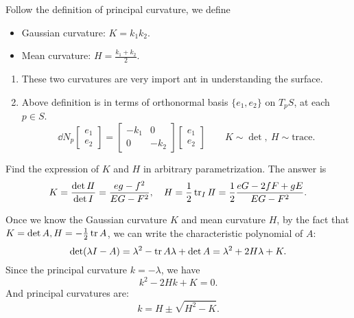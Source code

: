 \begin{definition}
    Follow the definition of principal curvature, we define
    \begin{itemize}
        \item Gaussian curvature: \(K=k_1k_2\).
        \item Mean curvature: \(H=\frac{k_1+k_2}{2}\).
    \end{itemize}
\end{definition}

\begin{remark}
\begin{enumerate}[(1)]
    \item These two curvatures are very import ant in understanding the surface.
    \item Above definition is in terms of orthonormal basis \(\{e_1,e_2\}\) on
        \(T_p S\), at each \(p\in S\). \[
            \dd{N}_p \begin{bmatrix}
                e_1 \\ e_2
            \end{bmatrix}=\begin{bmatrix}
                -k_1 & 0 \\
                0 & -k_2
            \end{bmatrix}\begin{bmatrix}
                e_1 \\ e_2
            \end{bmatrix}
            \qquad
            K \sim \det,\ H \sim\mathrm{trace}
        .\] 
\end{enumerate}
\end{remark}

\begin{exercise}
    Find the expression of \(K\) and \(H\) in arbitrary parametrization.
    The answer is \[
        K=\frac{\det I\!I}{\det I}=\frac{eg-f^2}{EG-F^2},\quad
        H=\frac{1}{2}\tr_II\!I=\frac{1}{2}\frac{eG-2fF+gE}{EG-F^2}
    .\] 
\end{exercise}

Once we know the Gaussian curvature \(K\) and mean curvature \(H\), by
the fact that \(K=\det A,H=-\frac{1}{2}\tr A\), we can write the 
characteristic polynomial of \(A\): \[
    \det(\lambda I-A)=\lambda^2-\tr A \lambda+\det A
    =\lambda^2+2H\lambda+K
.\] Since the principal curvature \(k=-\lambda\), we have \[
    k^2-2Hk+K=0
.\] And principal curvatures are: \[
    k=H\pm \sqrt{H^2-K}
.\] 

